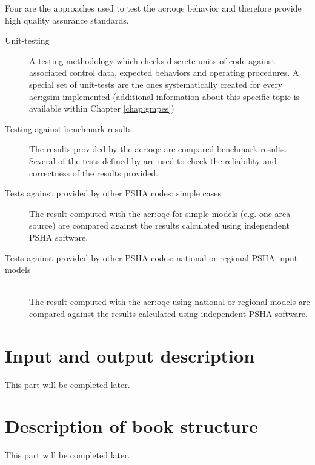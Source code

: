 Four are the approaches used to test the \gls{acr:oqe} behavior 
and therefore provide high quality assurance standards. 
%
\begin{description}
    \item [Unit-testing] A testing methodology which checks discrete 
        units of code against associated control data, expected behaviors 
        and operating procedures. A special set of unit-tests are the ones
        systematically created for every \gls{acr:gsim} implemented 
        (additional information about this specific topic is available within 
        Chapter \ref{chap:gmpes})
    \item [Testing against benchmark results] The results provided by the 
        \gls{acr:oqe} are compared benchmark results. Several of the 
        tests defined by \textcite{thomas2010} are used to check the 
        reliability and correctness of the results provided. 
    \item [Tests against provided by other PSHA codes: simple cases] 
        The result computed with the \gls{acr:oqe} for simple models (e.g. one
        area source) are compared against the results calculated using 
        independent PSHA software.
    \item [Tests against provided by other PSHA codes: national or regional 
        PSHA input models] \hfill \\ The result computed with the \gls{acr:oqe} 
        using national or regional models are compared against the 
        results calculated using independent PSHA software.
\end{description}
%
\section{Input and output description}
This part will be completed later.
%
\section{Description of book structure}
This part will be completed later.
